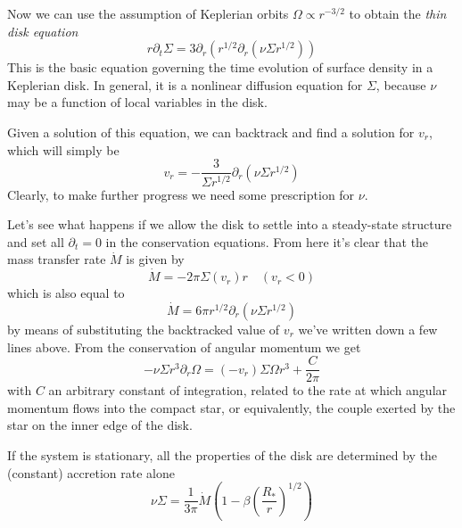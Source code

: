 \par Now we can use the assumption of Keplerian orbits $\Omega \propto r^{-3/2}$ to obtain the \emph{thin disk equation}
\begin{equation}
    \boxed{
    r\partial_{t}\Sigma = 3\partial_{r}\left(r^{1/2}\partial_{r}\left(\nu \Sigma r^{1/2}\right)\right)
    }
    \label{eq:thin_disk}
\end{equation}
This is the basic equation governing the time evolution of surface density in a Keplerian disk. In general, it is a nonlinear diffusion equation for $\Sigma$, because $\nu$ may be a function of local variables in the disk.
\par Given a solution of this equation, we can backtrack and find a solution for $v_{r}$, which will simply be 
\begin{equation*}
    \boxed{
    v_{r} = -\frac{3}{\Sigma r^{1/2}}\partial_{r}\left(\nu\Sigma r^{1/2}\right)
    }
\end{equation*}
Clearly, to make further progress we need some prescription for $\nu$.
\par Let's see what happens if we allow the disk to settle into a steady-state structure and set all $\partial_{t} = 0$ in the conservation equations. From here it's clear that the mass transfer rate $\dot{M}$ is given by
\begin{equation*}
    \dot{M} = -2\pi\Sigma (v_{r}) r \quad (v_{r}<0)
\end{equation*}
which is also equal to 
\begin{equation*}
    \dot{M} = 6\pi r^{1/2} \partial_{r}\left(\nu\Sigma r^{1/2}\right)
\end{equation*}
by means of substituting the backtracked value of $v_{r}$ we've written down a few lines above. From the conservation of angular momentum we get 
\begin{equation*}
    -\nu\Sigma r^{3}\partial_{r}\Omega = (-v_{r})\Sigma\Omega r^{3} + \frac{C}{2\pi}
\end{equation*}
with $C$ an arbitrary constant of integration, related to the rate at which angular momentum flows into the compact star, or equivalently, the couple exerted by the star on the inner edge of the disk.
\par If the system is stationary, all the properties of the disk are determined by the (constant) accretion rate alone 
\begin{equation}
    \boxed{
    \nu\Sigma = \frac{1}{3\pi}\dot{M}\left(1-\beta\left(\frac{R_{*}}{r}\right)^{1/2}\right)
    }
    \label{eq:stationary_viscosity}
\end{equation}
